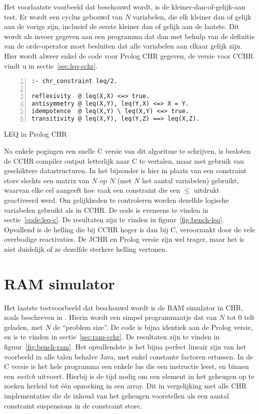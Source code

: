 Het voorlaatste voorbeeld dat beschouwd wordt, is de kleiner-dan-of-gelijk-aan test. Er wordt een cyclus gebouwd van $N$ variabelen, die elk kleiner dan of gelijk aan de vorige zijn, inclusief de eerste kleiner dan of gelijk aan de laatste. Dit wordt als invoer gegeven aan een programma dat dan met behulp van de definitie van de orde-operator moet besluiten dat alle variabelen aan elkaar gelijk zijn. Hier wordt alweer enkel de code voor Prolog CHR gegeven, de versie voor CCHR vindt u in sectie~\ref{sec:leq-cchr}.
\begin{exCode}
\begin{Verbatim}[frame=single,numbers=left]
:- chr_constraint leq/2.

reflexivity  @ leq(X,X) <=> true.
antisymmetry @ leq(X,Y), leq(Y,X) <=> X = Y.
idempotence  @ leq(X,Y) \ leq(X,Y) <=> true.
transitivity @ leq(X,Y), leq(Y,Z) ==> leq(X,Z).
\end{Verbatim}
\caption{\label{code:leq} LEQ in Prolog CHR}
\end{exCode}
Na enkele pogingen een snelle C versie van dit algoritme te schrijven, is besloten de CCHR compiler output letterlijk naar C te vertalen, maar met gebruik van geschiktere datastructuren. In het bijzonder is hier in plaats van een constraint store slechts een matrix van $N$ op $N$ (met $N$ het aantal variabelen) gebruikt, waarvan elke cel aangeeft hoe vaak een constraint die een $\leq$ uitdrukt geactiveerd werd. Om gelijkheden te controleren worden dezelfde logische variabelen gebruikt als in CCHR. De code is eveneens te vinden in sectie~\ref{code:leq-c}.
De resultaten zijn te vinden in figuur~\ref{fig:bench-leq}. Opvallend is de helling die bij CCHR hoger is dan bij C, veroorzaakt door de vele overbodige reactivaties. De JCHR en Prolog versie zijn wel trager, maar het is niet duidelijk of ze dezelfde sterkere helling vertonen.

\section{RAM simulator} \label{sec:bench-ram}

Het laatste testvoorbeeld dat beschouwd wordt is de RAM simulator in CHR, zoals beschreven in \cite{jon:complexity:chr05}.
Hierin wordt een simpel programmaatje dat van $N$ tot $0$ telt geladen, met $N$ de ``problem size''. De code is bijna identiek aan de Prolog versie, en is te vinden in sectie~\ref{sec:ram-cchr}.
De resultaten zijn te vinden in figuur~\ref{fig:bench-ram}. Het opvallendste is het bijna perfect lineair zijn van het voorbeeld in alle talen behalve Java, met enkel constante factoren ertussen. In de C versie is het hele programma een enkele lus die een instructie leest, en binnen een {\em switch} uitvoert. Hierbij is de tijd nodig om een element in het geheugen op te zoeken herleid tot \'e\'en opzoeking in een array. Dit in vergelijking met alle CHR implementaties die de inhoud van het geheugen voorstellen als een aantal constraint suspensions in de constraint store.

